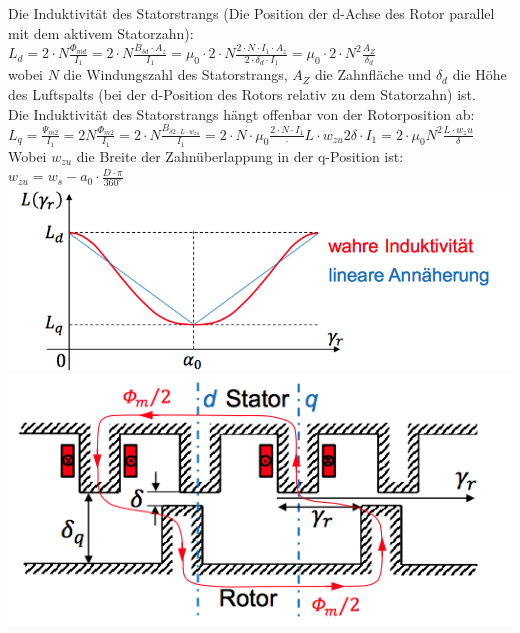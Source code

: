 \begin{minipage}{0.5 \linewidth}
Die Induktivität des Statorstrangs (Die Position der d-Achse des Rotor parallel mit dem aktivem Statorzahn): \\

$L_d = 2 \cdot N \frac{\Phi_{md}}{I_1} = 2 \cdot N \frac{B_{\delta d} \cdot A_z}{I_1} = \mu_0 \cdot 2 \cdot N \frac{2 \cdot N \cdot I_1 \cdot A_z}{2 \cdot \delta_d \cdot I_1} = \mu_0 \cdot 2 \cdot N^2 \frac{A_Z}{\delta_d}$ \\

wobei $N$ die Windungszahl des Statorstrangs, $A_Z$ die Zahnfläche und $\delta_d$ die Höhe des Luftspalts (bei der d-Position des Rotors relativ zu dem Statorzahn) ist. \\
Die Induktivität des Statorstrangs hängt offenbar von der Rotorposition ab: \\

$L_q = \frac{\Psi_{m2}}{I_1} = 2N \frac{\Phi_{m2}}{I_1} = 2 \cdot N \frac{B_{\delta2 \cdot L \cdot w_{zu}}}{I_1} = 2 \cdot N \cdot \mu_0 \frac{2 \cdot N \cdot I_1} \cdot L \cdot w_{zu}{2\delta \cdot I_1} = 2 \cdot \mu_0 N^2 \frac{L\cdot w_zu}{\delta}$ \\

Wobei $w_{zu}$ die Breite der Zahnüberlappung in der q-Position ist: \\

$w_{zu} = w_s - a_0 \cdot \frac{D \cdot \pi}{360^\circ} $ \\

\includegraphics[width = 0.8 \linewidth]{./Pics/VL67/Drehmoment3} \\
\includegraphics[width = 0.9 \linewidth]{./Pics/VL67/Drehmoment4} \\
\end{minipage}

